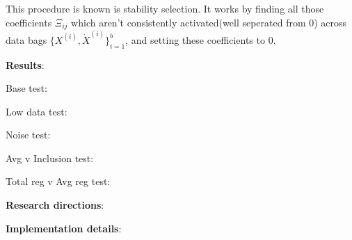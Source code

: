 \documentclass[11pt]{article}
\newcommand{\bs}{{\bigskip}}
\newcommand{\tb}{\textbf}
\begin{document}
  This procedure is known is stability selection.  It works by finding  all those coefficients $\Xi_{ij}$ which aren't consistently activated(well seperated from 0) across data bags $\{X^{(i)},  \dot{X}^{(i)}\}_{i=1}^b$,   and setting these coefficients to $0$.
  
  \pagebreak
 
 \tb{Results}:
 
 Base test:
 
 \bs
 
 Low data test:
 
 
  \bs
 
 Noise test:
 
 
  \bs
 
 Avg v Inclusion test:
 
 
  \bs
 
 Total reg v Avg reg test:
 
  \bs
 
 \pagebreak
 
 
 \tb{Research directions}:
  
  
  
  \pagebreak
  
  
  \tb{Implementation details}:
  
 \pagebreak
 
  
\end{document}

